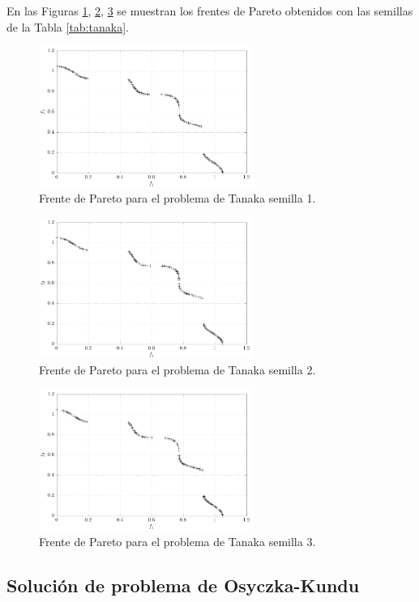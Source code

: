 \documentclass[conference]{IEEEtran}
\begin{document}
En las Figuras \ref{fig:tanaka1}, \ref{fig:tanaka2}, \ref{fig:tanaka3} se muestran los frentes de Pareto obtenidos con las semillas de la Tabla \ref{tab:tanaka}.

\begin{figure}[hbtp]
\centering
\includegraphics[width=7cm]{tanaka1.pdf}
\caption{Frente de Pareto para el problema de Tanaka semilla 1.}
\label{fig:tanaka1}
\end{figure}

\begin{figure}[hbtp]
\centering
\includegraphics[width=7cm]{tanaka2.pdf}
\caption{Frente de Pareto para el problema de Tanaka semilla 2.}
\label{fig:tanaka2}
\end{figure}

\begin{figure}[hbtp]
\centering
\includegraphics[width=7cm]{tanaka3.pdf}
\caption{Frente de Pareto para el problema de Tanaka semilla 3.}
\label{fig:tanaka3}
\end{figure}



\subsection{Solución de problema de  Osyczka-Kundu}
\end{document}
